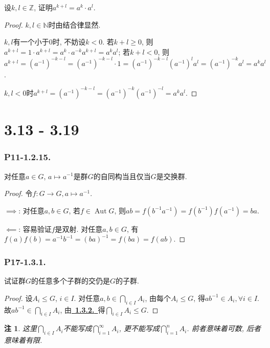 \documentclass[12pt, a4paper, fontset=windows]{ctexart}
\newcommand{\N}{\mathbb{N}}
\newcommand{\Z}{\mathbb{Z}}
\newcommand{\Aut}{\operatorname{Aut}}
\newcommand{\myref}[2][]{\hyperref[#1]{\color{blue}\ {#2}\ }}
\newtheorem*{remark}{注}
\begin{document}
设$k,l\in\Z$, 证明$a^{k+l}=a^k\cdot a^l$. 

\begin{proof}
$k,l\in\N$时由结合律显然. 

$k,l$有一个小于$0$时, 不妨设$k<0$. 若$k+l\ge 0$, 则
$a^{k+l}=1\cdot a^{k+l}=a^{k}\cdot a^{-k}a^{k+l}=a^ka^l$; 
若$k+l<0$, 则$a^{k+l}=(a^{-1})^{-k-l}=(a^{-1})^{-k-l}\cdot 1
=(a^{-1})^{-k-l}(a^{-1})^la^l=(a^{-1})^{-k}a^l=a^ka^l$. 

$k,l<0$时$a^{k+l}=(a^{-1})^{-k-l}=(a^{-1})^{-k}(a^{-1})^{-l}=a^ka^l$. 
\end{proof}

\clearpage
\part{3.13 - 3.19}

\section*{P11-1.2.15.}

对任意$a\in G$, $a\mapsto a^{-1}$是群$G$的自同构当且仅当$G$是交换群. 

\begin{proof}
令$f:G\to G,a\mapsto a^{-1}$.

$\implies$: 
对任意$a,b\in G$, 若$f\in\Aut G$, 则$ab=f(b^{-1}a^{-1})=f(b^{-1})f(a^{-1})=ba$. 

$\impliedby$: 
容易验证$f$是双射. 对任意$a,b\in G$, 有$f(a)f(b)=a^{-1}b^{-1}=(ba)^{-1}=f(ba)=f(ab)$. 
\end{proof}

\section*{P17-1.3.1.}

试证群$G$的任意多个子群的交仍是$G$的子群. 

\begin{proof}
设$A_i\le G$, $i\in I$. 对任意$a,b\in\bigcap_{i\in I}A_i$, 
由每个$A_i\le G$, 得$ab^{-1}\in A_i,\forall i\in I$. 
故$ab^{-1}\in\bigcap_{i\in I}A_i$, 
由\myref[subgroup]{\bf 1.3.2.}得$\bigcap_{i\in I}A_i\le G$. 
\end{proof}

\begin{remark}
这里$\bigcap_{i\in I}A_i$不能写成$\bigcap^\infty_{i=1}A_i$, 
更不能写成$\bigcap^n_{i=1}A_i$. 前者意味着可数, 后者意味着有限. 
\end{remark}
\end{document}
